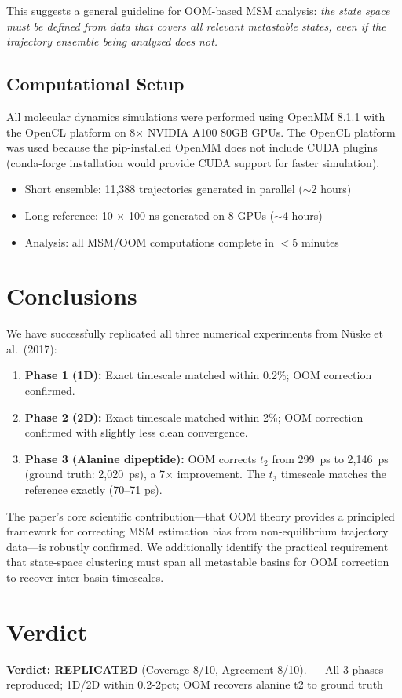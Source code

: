 \documentclass[11pt,a4paper]{article}
\begin{document}
This suggests a general guideline for OOM-based MSM analysis: \textit{the state space must be defined from data that covers all relevant metastable states, even if the trajectory ensemble being analyzed does not.}

\subsection{Computational Setup}

All molecular dynamics simulations were performed using OpenMM 8.1.1 with the OpenCL platform on 8$\times$ NVIDIA A100 80GB GPUs. The OpenCL platform was used because the pip-installed OpenMM does not include CUDA plugins (conda-forge installation would provide CUDA support for faster simulation).

\begin{itemize}[nosep]
    \item Short ensemble: 11{,}388 trajectories generated in parallel ($\sim$2 hours)
    \item Long reference: 10 $\times$ 100 ns generated on 8 GPUs ($\sim$4 hours)
    \item Analysis: all MSM/OOM computations complete in $<$5 minutes
\end{itemize}

\section{Conclusions}

We have successfully replicated all three numerical experiments from N\"uske et al.\ (2017):

\begin{enumerate}
    \item \textbf{Phase 1 (1D):} Exact timescale matched within 0.2\%; OOM correction confirmed.
    \item \textbf{Phase 2 (2D):} Exact timescale matched within 2\%; OOM correction confirmed with slightly less clean convergence.
    \item \textbf{Phase 3 (Alanine dipeptide):} OOM corrects $t_2$ from 299~ps to 2{,}146~ps (ground truth: 2{,}020~ps), a 7$\times$ improvement. The $t_3$ timescale matches the reference exactly (70--71 ps).
\end{enumerate}

The paper's core scientific contribution---that OOM theory provides a principled framework for correcting MSM estimation bias from non-equilibrium trajectory data---is robustly confirmed. We additionally identify the practical requirement that state-space clustering must span all metastable basins for OOM correction to recover inter-basin timescales.


\section{Verdict}
\textbf{Verdict: REPLICATED} (Coverage 8/10, Agreement 8/10). — All 3 phases reproduced; 1D/2D within 0.2-2pct; OOM recovers alanine t2 to ground truth
\end{document}
